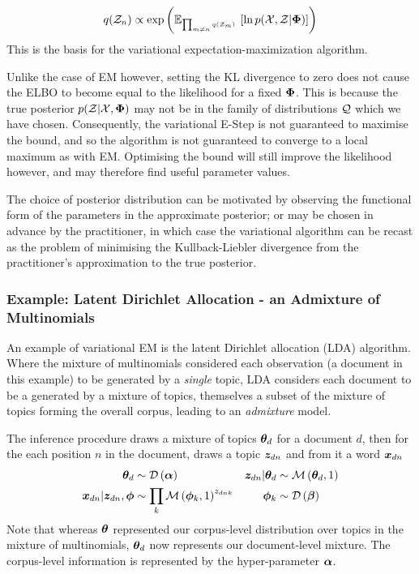 \begin{align}
q({ \mathcal{Z} }_n) \propto \exp\left( { \mathbb{E}_{ { {{ \mbox{\tiny ${\prod_{m\neq n} q({ \mathcal{Z} }_m)}$ } }} } }\left[ { \ln { p( { \mathcal{X} } ,  { \mathcal{Z} } |  {  \bm \Phi  } ) } } \right] }  \right)
\end{align}
This is the basis for the variational expectation-maximization algorithm\cite{Jordan1999a}\cite{Tzikas2008}.

Unlike the case of EM however, setting the KL divergence to zero does not cause the ELBO to become equal to the likelihood for a fixed ${ \bm \Phi }$. This is because the true posterior $p({ \mathcal{Z} } | { \mathcal{X} }, { \bm \Phi })$ may not be in the family of distributions ${ \mathcal{Q} }$ which we have chosen. Consequently, the variational E-Step is not guaranteed to maximise the bound, and so the algorithm is not guaranteed to converge to a local maximum as with EM. Optimising the bound will still improve the likelihood however, and may therefore find useful parameter values.

The choice of posterior distribution can be motivated by observing the functional form of the parameters in the approximate posterior\cite{Bishop2006}; or may be chosen in advance by the practitioner, in which case the variational algorithm can be recast as the problem of minimising the Kullback-Liebler divergence from the practitioner's approximation to the true posterior.


\subsubsection*{Example: Latent Dirichlet Allocation - an Admixture of Multinomials}
\label{sec:chap1:lda}
An example of variational EM is the latent Dirichlet allocation (LDA) algorithm\cite{BleiNgJordan2003}. Where the mixture of multinomials considered each observation (a document in this example) to be generated by a \emph{single} topic, LDA considers each document to be a generated by a mixture of topics, themselves a subset of the mixture of topics forming the overall corpus, leading to an \emph{admixture} model. 

The inference procedure draws a mixture of topics ${ \bm \theta_d }$ for a document $d$, then for the each position $n$ in the document, draws a topic ${ \bm z_{dn} }$ and from it a word ${ \bm x_{dn} }$
\begin{align}
{  \bm \theta _d } & \sim \mathcal{D} \left( {\bm \alpha} \right) &
{ \bm z_{dn} }|{ \bm \theta_d } & \sim \mathcal{M} \left( {{ \bm \theta_d }},{1} \right) \\
{ \bm x_{dn} }|{ \bm z_{dn} }, { \bm \phi } & \sim \prod_k \mathcal{M} \left( {{ \bm \phi }_k},{1} \right)^{{ z_{dnk} }} & 
{ \bm \phi }_k & \sim \mathcal{D} \left( {\bm \beta} \right)
\end{align}
Note that whereas $\bm \theta$ represented our corpus-level distribution over topics in the mixture of multinomials, ${ \bm \theta_d }$ now represents our document-level mixture. The corpus-level information is represented by the hyper-parameter $\bm \alpha$. 


